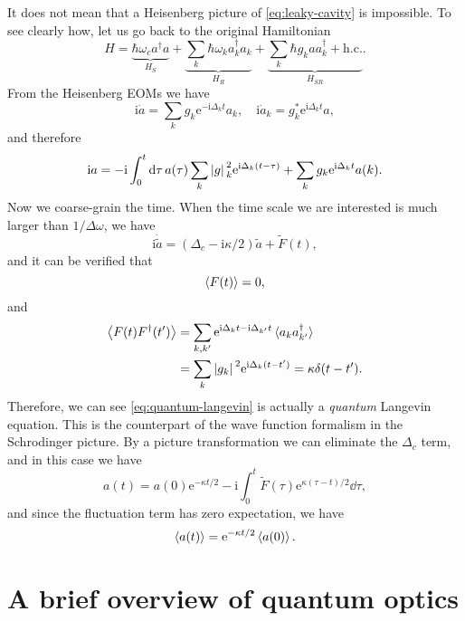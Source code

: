 \documentclass[hyperref, a4paper]{article}
\newcommand*{\ii}{\mathrm{i}}
\newcommand*{\ee}{\mathrm{e}}
\begin{document}
It does not mean that a Heisenberg picture of \eqref{eq:leaky-cavity} is impossible. To see clearly how, 
let us go back to the original Hamiltonian 
\begin{equation}
    H = \underbrace{\hbar \omega_c a^\dagger a}_{H_S} + \underbrace{\sum_k \hbar \omega_k a^\dagger_k a_k}_{H_R} + \underbrace{\sum_k \hbar g_k a a_k^\dagger + \text{h.c.}}_{H_{SR}}.
\end{equation}
From the Heisenberg EOMs we have 
\[
    \ii \dot{a} = \sum_k g_k \ee^{- \ii \Delta_k t} a_k, \quad \ii \dot{a}_k = g_k^* \ee^{\ii \Delta_k t} a,
\]
and therefore 
\[
    \ii a = - \ii \int_0^t \dd{\tau} a(\tau) \sum_k \abs*{g}_k^2 \ee^{\ii \Delta_k (t - \tau)}
    + \sum_k g_k \ee^{\ii \Delta_k t} a(k).
\]
Now we coarse-grain the time. When the time scale we are interested is much larger than $1 / \Delta \omega$,
we have 
\begin{equation}
    \ii \dot{\tilde{a}} = (\Delta_c - \ii \kappa / 2) \tilde{a} + \tilde{F}(t),
    \label{eq:quantum-langevin}
\end{equation}
and it can be verified that 
\begin{equation}
    \expval{F(t)} = 0, 
\end{equation}
and 
\begin{equation}
    \begin{aligned}
        \expval{F(t) F^\dagger(t')} &= \sum_{k, k'} \ee^{\ii \Delta_k t - \ii \Delta_{k'} t} \expval*{a_k a^\dagger_{k'}} \\
        &= \sum_k \abs*{g_k}^2 \ee^{\ii \Delta_k (t - t')} = \kappa \delta(t - t').
    \end{aligned}
\end{equation}
Therefore, we can see \eqref{eq:quantum-langevin} is actually a \emph{quantum} Langevin equation.
This is the counterpart of the wave function formalism in the Schrodinger picture.
By a picture transformation we can eliminate the $\Delta_c$ term, and in this case we have 
\begin{equation}
    a(t) = a(0) \ee^{- \kappa t / 2} - \ii \int_0^t \tilde{F}(\tau) \ee^{\kappa (\tau - t) / 2} \dd{\tau},
\end{equation}
and since the fluctuation term has zero expectation, we have  
\begin{equation}
    \expval{a(t)} = \ee^{- \kappa t / 2} \expval{a(0)}.
\end{equation}

\section{A brief overview of quantum optics}
\end{document}
